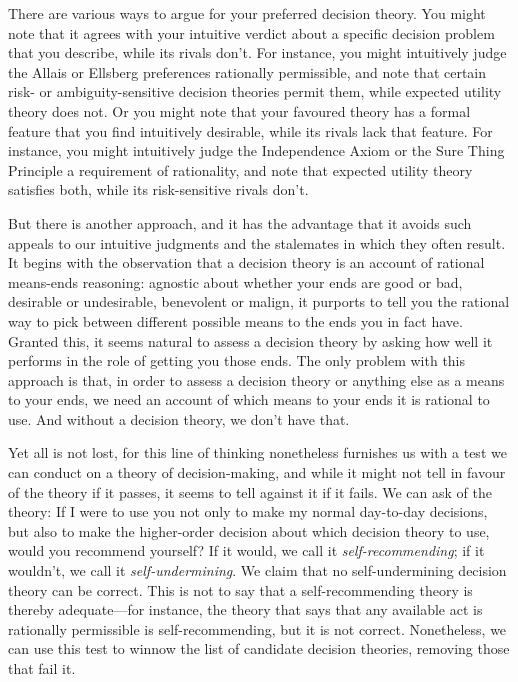 \documentclass[a4paper]{article}
\newenvironment{CCM rewritten}
{\begingroup\color{blue}} %
{\endgroup}              %
\begin{document}
There are various ways to argue for your preferred decision theory. You might note that it agrees with your intuitive verdict about a specific decision problem that you describe, while its rivals don't. For instance, you might intuitively judge the Allais or Ellsberg preferences rationally permissible, and note that certain risk- or ambiguity-sensitive decision theories permit them, while expected utility theory does not. Or you might note that your favoured theory has a formal feature that you find intuitively desirable, while its rivals lack that feature. For instance, you might intuitively judge the Independence Axiom or the Sure Thing Principle a requirement of rationality, and note that expected utility theory satisfies both, while its risk-sensitive rivals don't.
	
But there is another approach, and it has the advantage that it avoids such appeals to our intuitive judgments and the stalemates in which they often result. It begins with the observation that a decision theory is an account of rational means-ends reasoning: agnostic about whether your ends are good or bad, desirable or undesirable, benevolent or malign, it purports to tell you the rational way to pick between different possible means to the ends you in fact have. Granted this, it seems natural to assess a decision theory by asking how well it performs in the role of getting you those ends. The only problem with this approach is that, in order to assess a decision theory or anything else as a means to your ends, we need an account of which means to your ends it is rational to use. And without a decision theory, we don't have that. 
	
Yet all is not lost, for this line of thinking nonetheless furnishes us with a test we can conduct on a theory of decision-making, and while it might not tell in favour of the theory if it passes, it seems to tell against it if it fails. We can ask of the theory: If I were to use you not only to make my normal day-to-day decisions, but also to make the higher-order decision about which decision theory to use, would you recommend yourself? If it would, we call it \emph{self-recommending}; if it wouldn't, we call it \emph{self-undermining}. We claim that no self-undermining decision theory can be correct. This is not to say that a self-recommending theory is thereby adequate---for instance, the theory that says that any available act is rationally permissible is self-recommending, but it is not correct. Nonetheless, we can use this test to winnow the list of candidate decision theories, removing those that fail it.
\end{document}
